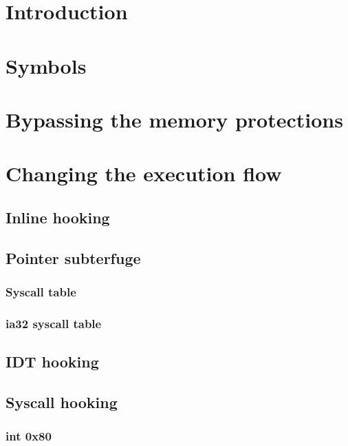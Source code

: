 \documentclass{article}
\begin{document}
\pagestyle{empty}
\titleAT
\tableofcontents
\clearpage
\pagestyle{fancy}

\section{Introduction}


\section{Symbols}


\section{Bypassing the memory protections}


\section{Changing the execution flow}
\subsection{Inline hooking}


\subsection{Pointer subterfuge}
\subsubsection{Syscall table}
\subsubsection{ia32 syscall table}

\subsection{IDT hooking}

\subsection{Syscall hooking}
\subsubsection{int 0x80}
\end{document}
